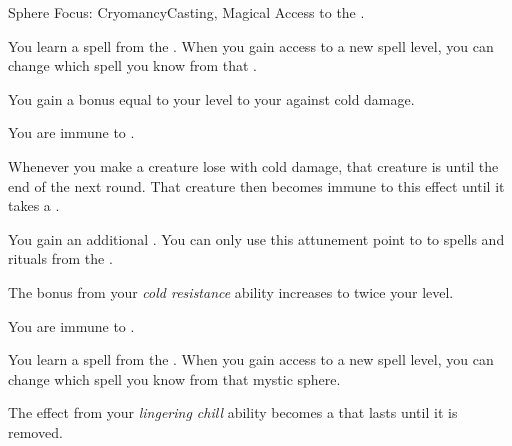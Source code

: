     \begin{feat}{Sphere Focus: Cryomancy}{Casting, Magical}
        \featpre Access to the  .

         You learn a spell from the  .
        When you gain access to a new spell level, you can change which spell you know from that .

         You gain a bonus equal to your level to your  against cold damage.

         You are immune to .

         Whenever you make a creature lose  with cold damage, that creature is \slowed until the end of the next round.
        That creature then becomes immune to this effect until it takes a .

         You gain an additional .
        You can only use this attunement point to  to spells and rituals from the  .

         The bonus from your \textit{cold resistance} ability increases to twice your level.

         You are immune to .

         You learn a spell from the  .
        When you gain access to a new spell level, you can change which spell you know from that mystic sphere.

         The \slowed effect from your \textit{lingering chill} ability becomes a  that lasts until it is removed.
    \end{feat}

